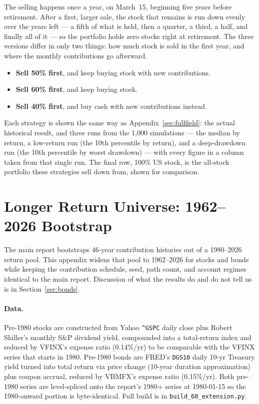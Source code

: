 \documentclass[11pt]{article}
\begin{document}
The selling happens once a year, on March~15, beginning five years before retirement. After a first,
larger sale, the stock that remains is run down evenly over the years left --- a fifth of what is held,
then a quarter, a third, a half, and finally all of it --- so the portfolio holds zero stocks right at
retirement. The three versions differ in only two things: how much stock is sold in the first year, and
where the monthly contributions go afterward.
\begin{itemize}
\item \textbf{Sell 50\% first}, and keep buying stock with new contributions.
\item \textbf{Sell 60\% first}, and keep buying stock.
\item \textbf{Sell 40\% first}, and buy cash with new contributions instead.
\end{itemize}

\noindent Each strategy is shown the same way as Appendix~\ref{sec:fullfield}: the actual historical result, and three
runs from the 1{,}000 simulations --- the median by return, a low-return run (the 10th percentile by
return), and a deep-drawdown run (the 10th percentile by worst drawdown) --- with every figure in a
column taken from that single run. The final row, 100\% US stock, is the all-stock portfolio these strategies sell
down from, shown for comparison.



\section{Longer Return Universe: 1962--2026 Bootstrap}\label{sec:longwindow}

The main report bootstraps 46-year contribution histories out of a 1980--2026 return pool. This
appendix widens that pool to 1962--2026 for stocks and bonds while keeping the contribution schedule,
seed, path count, and account regimes identical to the main report. Discussion of what the results
do and do not tell us is in Section~\ref{sec:bonds}.

\paragraph{Data.} Pre-1980 stocks are constructed from Yahoo \texttt{\^{}GSPC} daily close plus
Robert Shiller's monthly S\&P dividend yield, compounded into a total-return index and reduced by
VFINX's expense ratio (0.14\%/yr) to be comparable with the VFINX series that starts in 1980.
Pre-1980 bonds are FRED's \texttt{DGS10} daily 10-yr Treasury yield turned into total return via
price change (10-year duration approximation) plus coupon accrual, reduced by VBMFX's expense ratio
(0.15\%/yr). Both pre-1980 series are level-spliced onto the report's 1980+ series at 1980-01-15
so the 1980-onward portion is byte-identical. Full build is in \texttt{build\_60\_extension.py}.
\end{document}
